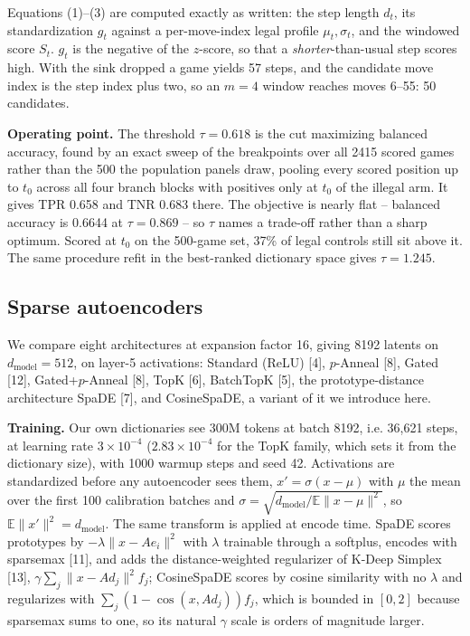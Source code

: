 \documentclass{article}
\begin{document}
Equations (1)--(3) are computed exactly as written: the step length $d_t$, its standardization
$g_t$ against a per-move-index legal profile $\mu_t, \sigma_t$, and the windowed score $S_t$.
$g_t$ is the negative of the $z$-score, so that a \emph{shorter}-than-usual step scores high. With
the sink dropped a game yields 57 steps, and the candidate move index is the step index plus two,
so an $m = 4$ window reaches moves 6--55: 50 candidates.

\textbf{Operating point.} The threshold $\tau = 0.618$ is the cut maximizing balanced accuracy,
found by an exact sweep of the breakpoints over all 2415 scored games rather than the 500 the
population panels draw, pooling every
scored position up to $t_0$ across all four branch blocks with positives only at $t_0$ of the
illegal arm. It gives TPR 0.658 and TNR 0.683 there. The objective is nearly flat -- balanced accuracy is
0.6644 at $\tau = 0.869$ -- so $\tau$ names a trade-off rather than a sharp optimum. Scored at
$t_0$ on the 500-game set, 37\% of legal controls still sit above it. The same procedure refit in the best-ranked dictionary space
gives $\tau = 1.245$.

\subsection{Sparse autoencoders}

We compare eight architectures at expansion factor 16, giving 8192 latents on
$d_{\mathrm{model}} = 512$, on layer-5 activations: Standard (ReLU) [4], $p$-Anneal [8], Gated [12],
Gated+$p$-Anneal [8], TopK [6], BatchTopK [5], the prototype-distance architecture SpaDE [7],
and CosineSpaDE, a variant of it we introduce here.

\textbf{Training.} Our own dictionaries see 300M tokens at batch 8192, i.e. 36,621 steps, at
learning rate $3\times10^{-4}$ ($2.83\times10^{-4}$ for the TopK family, which sets it from the
dictionary size), with 1000 warmup steps and seed 42. Activations are standardized before any autoencoder sees
them, $x' = \sigma (x - \mu)$ with $\mu$ the mean over the first 100 calibration batches and
$\sigma = \sqrt{d_{\mathrm{model}} / \mathbb{E}\|x - \mu\|^2}$, so $\mathbb{E}\|x'\|^2 = d_{\mathrm{model}}$. The same transform is applied at encode time. SpaDE scores prototypes by
$-\lambda\|x - Ae_i\|^2$ with $\lambda$ trainable through a softplus, encodes with sparsemax [11],
and adds the distance-weighted regularizer of K-Deep Simplex [13],
$\gamma \sum_j \|x - Ad_j\|^2 f_j$; CosineSpaDE scores
by cosine similarity with no $\lambda$ and regularizes with $\sum_j (1 - \cos(x, Ad_j)) f_j$,
which is bounded in $[0, 2]$ because sparsemax sums to one, so its natural $\gamma$ scale is
orders of magnitude larger.
\end{document}
